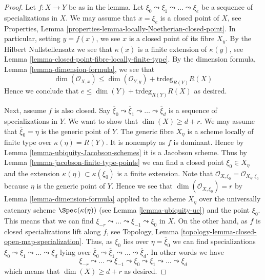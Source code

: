 \begin{proof}
Let $f : X \to Y$ be as in the lemma.
Let $\xi_0 \leadsto \xi_1 \leadsto \ldots \leadsto \xi_e$ be
a sequence of specializations in $X$. We may assume that $x = \xi_e$
is a closed point of $X$, see
Properties, Lemma \ref{properties-lemma-locally-Noetherian-closed-point}.
In particular, setting $y = f(x)$, we see $x$ is a closed point of its fibre
$X_y$. By the Hilbert Nullstellensatz we see that $\kappa(x)$ is a finite
extension of $\kappa(y)$, see
Lemma \ref{lemma-closed-point-fibre-locally-finite-type}.
By the dimension formula, Lemma \ref{lemma-dimension-formula},
we see that
$$
\dim(\mathcal{O}_{X, x}) \leq \dim(\mathcal{O}_{Y, y}) +
\text{trdeg}_{R(Y)} R(X)
$$
Hence we conclude that $e \leq \dim(Y) + \text{trdeg}_{R(Y)} R(X)$ as desired.

\medskip\noindent
Next, assume $f$ is also closed.
Say $\overline{\xi}_0 \leadsto \overline{\xi}_1 \leadsto \ldots
\leadsto \overline{\xi}_d$ is a sequence of specializations in $Y$.
We want to show that $\dim(X) \geq d + r$.
We may assume that $\overline{\xi}_0 = \eta$ is the generic point of $Y$.
The generic fibre $X_\eta$ is a scheme locally of finite type over
$\kappa(\eta) = R(Y)$. It is nonempty as $f$ is dominant. Hence by
Lemma \ref{lemma-ubiquity-Jacobson-schemes} it is a Jacobson scheme.
Thus by Lemma \ref{lemma-jacobson-finite-type-points}
we can find a closed point $\xi_0 \in X_\eta$ and the extension
$\kappa(\eta) \subset \kappa(\xi_0)$ is
a finite extension. Note that
$\mathcal{O}_{X, \xi_0} = \mathcal{O}_{X_\eta, \xi_0}$ because
$\eta$ is the generic point of $Y$. Hence we see that
$\dim(\mathcal{O}_{X, \xi_0}) = r$ by Lemma \ref{lemma-dimension-formula}
applied to the scheme $X_\eta$ over the universally catenary
scheme $\Spec(\kappa(\eta))$ (see Lemma \ref{lemma-ubiquity-uc})
and the point $\xi_0$. This means that we can find
$\xi_{-r} \leadsto \ldots \leadsto \xi_{-1} \leadsto \xi_0$
in $X$. On the other hand, as $f$ is closed specializations
lift along $f$, see
Topology, Lemma \ref{topology-lemma-closed-open-map-specialization}.
Thus, as $\xi_0$ lies
over $\eta = \overline{\xi}_0$ we can
find specializations $\xi_0 \leadsto \xi_1 \leadsto \ldots \leadsto \xi_d$
lying over $\overline{\xi}_0 \leadsto \overline{\xi}_1 \leadsto \ldots
\leadsto \overline{\xi}_d$. In other words we have
$$
\xi_{-r} \leadsto \ldots \leadsto \xi_{-1} \leadsto \xi_0
\leadsto \xi_1 \leadsto \ldots \leadsto \xi_d
$$
which means that $\dim(X) \geq d + r$ as desired.
\end{proof}

